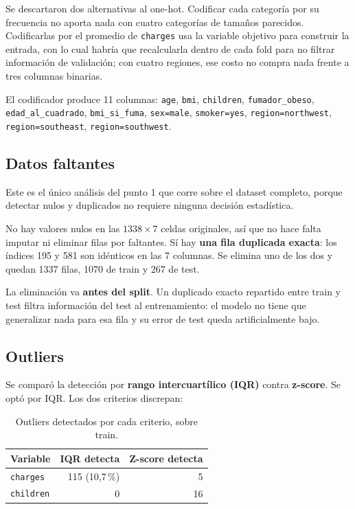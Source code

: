 \documentclass[11pt,a4paper]{article}
\begin{document}
Se descartaron dos alternativas al one-hot. Codificar cada categoría por su frecuencia no
aporta nada con cuatro categorías de tamaños parecidos. Codificarlas por el promedio de
\texttt{charges} usa la variable objetivo para construir la entrada, con lo cual habría que
recalcularla dentro de cada fold para no filtrar información de validación; con cuatro
regiones, ese costo no compra nada frente a tres columnas binarias.

\begin{sloppypar}
El codificador produce 11 columnas: \texttt{age}, \texttt{bmi}, \texttt{children},
\texttt{fumador\_obeso}, \texttt{edad\_al\_cuadrado}, \texttt{bmi\_si\_fuma},
\texttt{sex=male}, \texttt{smoker=yes}, \texttt{region=northwest},
\texttt{region=southeast}, \texttt{region=southwest}.
\end{sloppypar}

\subsection{Datos faltantes}
\label{sec:faltantes}

Este es el único análisis del punto 1 que corre sobre el dataset completo, porque detectar
nulos y duplicados no requiere ninguna decisión estadística.

No hay valores nulos en las $1338 \times 7$ celdas originales, así que no hace falta imputar
ni eliminar filas por faltantes. Sí hay \textbf{una fila duplicada exacta}: los índices 195 y
581 son idénticos en las 7 columnas. Se elimina uno de los dos y quedan 1337 filas, 1070 de
train y 267 de test.

La eliminación va \textbf{antes del split}. Un duplicado exacto repartido entre train y test
filtra información del test al entrenamiento: el modelo no tiene que generalizar nada para esa
fila y su error de test queda artificialmente bajo.

\subsection{Outliers}

Se comparó la detección por \textbf{rango intercuartílico (IQR)} contra \textbf{z-score}. Se
optó por IQR. Los dos criterios discrepan:

\begin{table}[H]
\centering
\caption{Outliers detectados por cada criterio, sobre train.}
\begin{tabular}{lrr}
\toprule
\textbf{Variable} & \textbf{IQR detecta} & \textbf{Z-score detecta} \\
\midrule
\texttt{charges}  & 115 (10,7\,\%) & 5 \\
\texttt{children} & 0              & 16 \\
\bottomrule
\end{tabular}
\end{table}
\end{document}
